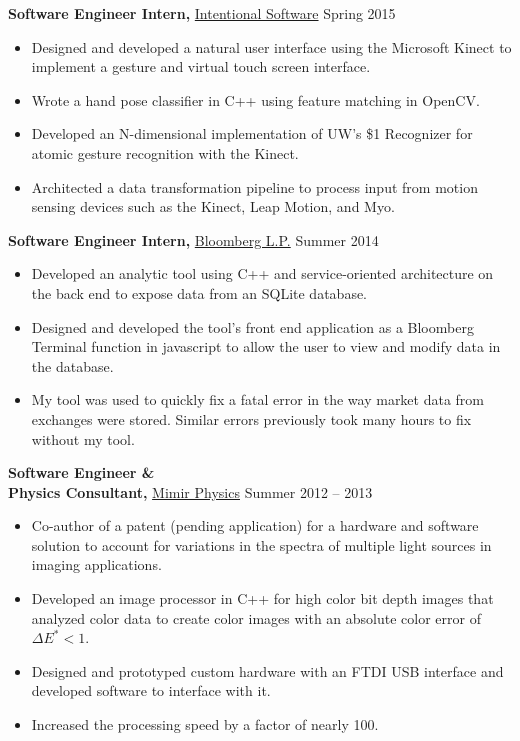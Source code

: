 \documentclass[margin]{res}
\begin{document}
\begin{minipage}{\textwidth}
\begin{resume}
{\bf Software Engineer Intern,} \uline{Intentional Software} \hfill Spring 2015
 \begin{itemize} \itemsep -2pt %
 \item Designed and developed a natural user interface using the Microsoft Kinect to implement a gesture and virtual touch screen interface.
 \item Wrote a hand pose classifier in C++ using feature matching in OpenCV.
 \item Developed an N-dimensional implementation of UW's \$1 Recognizer for atomic gesture recognition with the Kinect. %
 \item Architected a data transformation pipeline to process input from motion sensing devices such as the Kinect, Leap Motion, and Myo.
 \end{itemize}



{\bf Software Engineer Intern,} \uline{Bloomberg L.P.} \hfill Summer 2014
 \begin{itemize} \itemsep -2pt
 \item Developed an analytic tool using C++ and service-oriented architecture on the back end to expose data from an SQLite database.
 \item Designed and developed the tool's front end application as a Bloomberg Terminal function in javascript to allow the user to view and modify data in the database.
 \item My tool was used to quickly fix a fatal error in the way market data from exchanges were stored. Similar errors previously took many hours to fix without my tool.
 \end{itemize}



{\bf Software Engineer \& \\ Physics Consultant,} \uline{Mimir Physics} \hfill Summer 2012 -- 2013
 \begin{itemize} \itemsep -2pt  %
 \item Co-author of a patent (pending application) for a hardware and software solution to account for variations in the spectra of multiple light sources in imaging applications.
 \item Developed an image processor in C++ for high color bit depth images that analyzed color data to create color images with an absolute color error of $\Delta E^* < 1$.
 \item Designed and prototyped custom hardware with an FTDI USB interface  and developed software to interface with it.
 \item Increased the processing speed by a factor of nearly 100.
 \end{itemize}


\end{resume}
\end{minipage}
\end{document}
